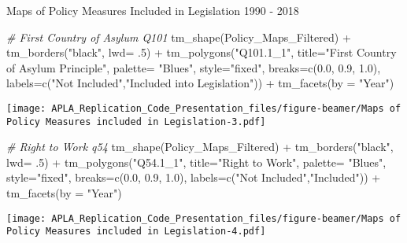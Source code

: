 \documentclass[
  ignorenonframetext,
]{beamer}
\newenvironment{Shaded}{\begin{snugshade}}{\end{snugshade}}
\newcommand{\AttributeTok}[1]{\textcolor[rgb]{0.77,0.63,0.00}{#1}}
\newcommand{\CommentTok}[1]{\textcolor[rgb]{0.56,0.35,0.01}{\textit{#1}}}
\newcommand{\DecValTok}[1]{\textcolor[rgb]{0.00,0.00,0.81}{#1}}
\newcommand{\FloatTok}[1]{\textcolor[rgb]{0.00,0.00,0.81}{#1}}
\newcommand{\FunctionTok}[1]{\textcolor[rgb]{0.00,0.00,0.00}{#1}}
\newcommand{\NormalTok}[1]{#1}
\newcommand{\SpecialCharTok}[1]{\textcolor[rgb]{0.00,0.00,0.00}{#1}}
\newcommand{\StringTok}[1]{\textcolor[rgb]{0.31,0.60,0.02}{#1}}
\begin{document}
\begin{frame}[fragile]{Maps of Policy Measures Included in Legislation
1990 - 2018}
\begin{Shaded}
\begin{Highlighting}[]
\CommentTok{\# First Country of Asylum  Q101}
\FunctionTok{tm\_shape}\NormalTok{(Policy\_Maps\_Filtered) }\SpecialCharTok{+} \FunctionTok{tm\_borders}\NormalTok{(}\StringTok{"black"}\NormalTok{, }\AttributeTok{lwd=}\NormalTok{ .}\DecValTok{5}\NormalTok{) }\SpecialCharTok{+} \FunctionTok{tm\_polygons}\NormalTok{(}\StringTok{"Q101.1\_1"}\NormalTok{, }\AttributeTok{title=}\StringTok{"First Country of Asylum Principle"}\NormalTok{, }\AttributeTok{palette=} \StringTok{"Blues"}\NormalTok{, }\AttributeTok{style=}\StringTok{"fixed"}\NormalTok{, }\AttributeTok{breaks=}\FunctionTok{c}\NormalTok{(}\FloatTok{0.0}\NormalTok{, }\FloatTok{0.9}\NormalTok{, }\FloatTok{1.0}\NormalTok{), }\AttributeTok{labels=}\FunctionTok{c}\NormalTok{(}\StringTok{"Not Included"}\NormalTok{,}\StringTok{"Included into Legislation"}\NormalTok{)) }\SpecialCharTok{+} \FunctionTok{tm\_facets}\NormalTok{(}\AttributeTok{by =} \StringTok{"Year"}\NormalTok{)}
\end{Highlighting}
\end{Shaded}

\texttt{[image: APLA\_Replication\_Code\_Presentation\_files/figure-beamer/Maps of Policy Measures included in Legislation-3.pdf]}

\begin{Shaded}
\begin{Highlighting}[]
\CommentTok{\# Right to Work q54}
\FunctionTok{tm\_shape}\NormalTok{(Policy\_Maps\_Filtered) }\SpecialCharTok{+} \FunctionTok{tm\_borders}\NormalTok{(}\StringTok{"black"}\NormalTok{, }\AttributeTok{lwd=}\NormalTok{ .}\DecValTok{5}\NormalTok{) }\SpecialCharTok{+} \FunctionTok{tm\_polygons}\NormalTok{(}\StringTok{"Q54.1\_1"}\NormalTok{, }\AttributeTok{title=}\StringTok{"Right to Work"}\NormalTok{, }\AttributeTok{palette=} \StringTok{"Blues"}\NormalTok{, }\AttributeTok{style=}\StringTok{"fixed"}\NormalTok{, }\AttributeTok{breaks=}\FunctionTok{c}\NormalTok{(}\FloatTok{0.0}\NormalTok{, }\FloatTok{0.9}\NormalTok{, }\FloatTok{1.0}\NormalTok{), }\AttributeTok{labels=}\FunctionTok{c}\NormalTok{(}\StringTok{"Not Included"}\NormalTok{,}\StringTok{"Included"}\NormalTok{)) }\SpecialCharTok{+} \FunctionTok{tm\_facets}\NormalTok{(}\AttributeTok{by =} \StringTok{"Year"}\NormalTok{)}
\end{Highlighting}
\end{Shaded}

\texttt{[image: APLA\_Replication\_Code\_Presentation\_files/figure-beamer/Maps of Policy Measures included in Legislation-4.pdf]}


\end{frame}
\end{document}

